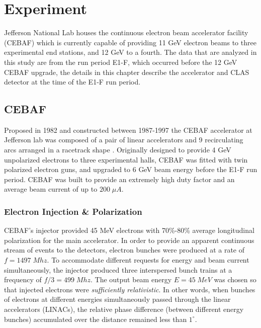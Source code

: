 \chapter{Experiment}

Jefferson National Lab houses the continuous electron beam accelerator facility (CEBAF) which is currently capable of providing 11 GeV electron beams to three experimental end stations, and 12 GeV to a fourth.  The data that are analyzed in this study are from the run period E1-F, which occurred before the 12 GeV CEBAF upgrade, the details in this chapter describe the accelerator and CLAS detector at the time of the E1-F run period.  \\

\section{CEBAF} 
Proposed in 1982 and constructed between 1987-1997 the CEBAF accelerator at Jefferson lab was composed of a pair of linear accelerators and 9 recirculating arcs arranged in a racetrack shape \cite{hardware-leeman:2001, hardware-chao:2011}.  Originally designed to provide 4 GeV unpolarized electrons to three experimental halls, CEBAF was fitted with twin polarized electron guns, and upgraded to 6 GeV beam energy before the E1-F run period.  CEBAF was built to provide an extremely high duty factor and an average beam current of up to $200 \; \mu A$.\\

\subsection{Electron Injection \& Polarization}
CEBAF's injector provided 45 MeV electrons with 70\%-80\% average longitudinal polarization for the main accelerator.  In order to provide an apparent continuous stream of events to the detectors, electron bunches were produced at a rate of $f = 1497 \; Mhz$.  To accommodate different requests for energy and beam current simultaneously, the injector produced three interspersed bunch trains at a frequency of $f/3 = 499 \; Mhz$.  The output beam energy $E = 45 \; MeV$ was chosen so that injected electrons were \textit{sufficiently relativistic}.  In other words, when bunches of electrons at different energies simultaneously passed through the linear accelerators (LINACs), the relative phase difference (between different energy bunches) accumulated over the distance remained less than $1^\circ$. \\

